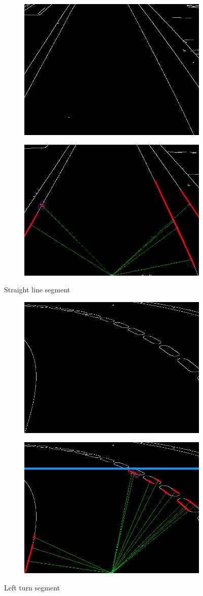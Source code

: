 \documentclass [10pt]{article}
\begin{document}
 \begin{figure}[h]
\centering
\begin{subfigure}
  \centering
  \includegraphics[width=.4\linewidth]{figures/straight_canny.png}
\end{subfigure}%
\begin{subfigure}
  \centering
  \includegraphics[width=.4\linewidth]{figures/straight_h.png}
\end{subfigure}
\caption{Straight line segment}
\label{fig:Fig2}
\end{figure}


\begin{figure}[h]
\centering
\begin{subfigure}
  \centering
  \includegraphics[width=.4\linewidth]{figures/left_c.png}
\end{subfigure}%
\begin{subfigure}
  \centering
  \includegraphics[width=.4\linewidth]{figures/left_h.png}
\end{subfigure}
\caption{Left turn segment}
\label{fig:Fig3}
\end{figure}
\end{document}
